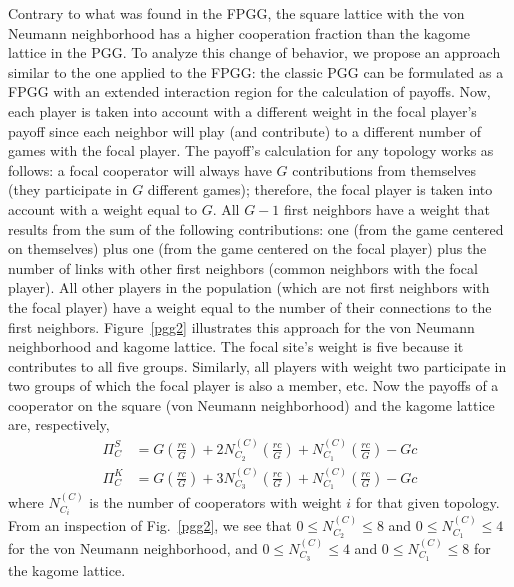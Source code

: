 \documentclass[5p,review]{elsarticle}
\begin{document}
Contrary to what was found in the FPGG, the square lattice with the von Neumann neighborhood has a higher cooperation fraction than the kagome lattice in the PGG. 
%
To analyze this change of behavior, we propose an approach similar to the one applied to the FPGG: the classic PGG can be formulated as a FPGG with an extended interaction region for the calculation of payoffs. Now, each player is taken into account with a different weight in the focal player's payoff since each neighbor will play (and contribute) to a different number of games with the focal player.
%
The payoff's calculation for any topology works as follows: a focal cooperator will always have $G$ contributions from themselves (they participate in $G$ different games); therefore, the focal player is taken into account with a weight equal to $G$. 
%
All $G-1$ first  neighbors have a weight that results from the sum of the following contributions: one (from the game centered on themselves) plus one (from 
the game centered on the focal player) plus the number of links with other first neighbors (common neighbors with the focal player).
%
All other players in the population (which are not first neighbors with the focal player) have a weight equal to the number of their connections to the first neighbors. 
%
Figure~\ref{pgg2} illustrates this approach for the von Neumann neighborhood and kagome lattice. The focal site's weight is five because it contributes to all five groups. Similarly, all players with weight two participate in two groups of which the focal player is also a member, etc.
%
Now the payoffs of a cooperator on the square (von Neumann neighborhood) and the kagome lattice are, respectively,
\begin{align}
    \Pi_{C}^S&= G\left(\frac{r c}{G}\right)+2 N_{C_2}^{{\scriptscriptstyle(C)}} \left(\frac{r c}{G}\right)+N_{C_1}^{{\scriptscriptstyle(C)}} \left(\frac{r c}{G}\right)-G c \label{eq_square}\\
    \Pi_{C}^K&=G\left(\frac{r c}{G}\right)+3 N_{C_3}^{{\scriptscriptstyle(C)}} \left(\frac{r c}{G}\right)+N_{C_1}^{{\scriptscriptstyle(C)}} \left(\frac{r c}{G}\right)-G c \label{eq_kagome}
\end{align}
%
where $N_{C_i}^{{\scriptscriptstyle(C)}}$ is the number of cooperators with weight $i$ for that given topology. 
%
From an inspection of Fig.~\ref{pgg2}, we see that $0\leqslant N_{C_2}^{{\scriptscriptstyle(C)}}\leqslant 8$ and $0\leqslant N_{C_1}^{{\scriptscriptstyle(C)}}\leqslant 4$ for the von Neumann neighborhood, and $0\leqslant N_{C_3}^{{\scriptscriptstyle(C)}}\leqslant 4$ and $0\leqslant N_{C_1}^{{\scriptscriptstyle(C)}}\leqslant8$ for the kagome lattice.
\end{document}
